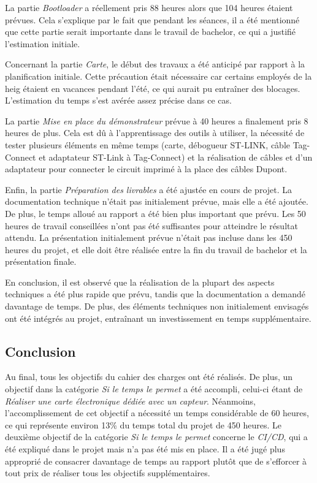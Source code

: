 La partie \textit{Bootloader} a réellement pris 88 heures alors que 104 heures étaient prévues.
Cela s'explique par le fait que pendant les séances, il a été mentionné que cette partie serait importante dans le travail de bachelor, ce qui a justifié l'estimation initiale.

Concernant la partie \textit{Carte}, le début des travaux a été anticipé par rapport à la planification initiale.
Cette précaution était nécessaire car certains employés de la \gls{heig} étaient en vacances pendant l'été, ce qui aurait pu entraîner des blocages.
L'estimation du temps s'est avérée assez précise dans ce cas.

La partie \textit{Mise en place du démonstrateur} prévue à 40 heures a finalement pris 8 heures de plus.
Cela est dû à l'apprentissage des outils à utiliser, la nécessité de tester plusieurs éléments en même temps (carte, débogueur ST-LINK, câble Tag-Connect et adaptateur ST-Link à Tag-Connect) et la réalisation de câbles et d'un adaptateur pour connecter le circuit imprimé à la place des câbles Dupont.

Enfin, la partie \textit{Préparation des livrables} a été ajustée en cours de projet.
La documentation technique n'était pas initialement prévue, mais elle a été ajoutée.
De plus, le temps alloué au rapport a été bien plus important que prévu.
Les 50 heures de travail conseillées n'ont pas été suffisantes pour atteindre le résultat attendu.
La présentation initialement prévue n'était pas incluse dans les 450 heures du projet, et elle doit être réalisée entre la fin du travail de bachelor et la présentation finale.

En conclusion, il est observé que la réalisation de la plupart des aspects techniques a été plus rapide que prévu, tandis que la documentation a demandé davantage de temps.
De plus, des éléments techniques non initialement envisagés ont été intégrés au projet, entraînant un investissement en temps supplémentaire.

\subsection{Conclusion}

Au final, tous les objectifs du cahier des charges ont été réalisés.
De plus, un objectif dans la catégorie \textit{Si le temps le permet} a été accompli, celui-ci étant de \textit{Réaliser une carte électronique dédiée avec un capteur}.
Néanmoins, l'accomplissement de cet objectif a nécessité un temps considérable de 60 heures, ce qui représente environ 13\% du temps total du projet de 450 heures.
Le deuxième objectif de la catégorie \textit{Si le temps le permet} concerne le \textit{CI/CD}, qui a été expliqué dans le projet mais n'a pas été mis en place.
Il a été jugé plus approprié de consacrer davantage de temps au rapport plutôt que de s'efforcer à tout prix de réaliser tous les objectifs supplémentaires.